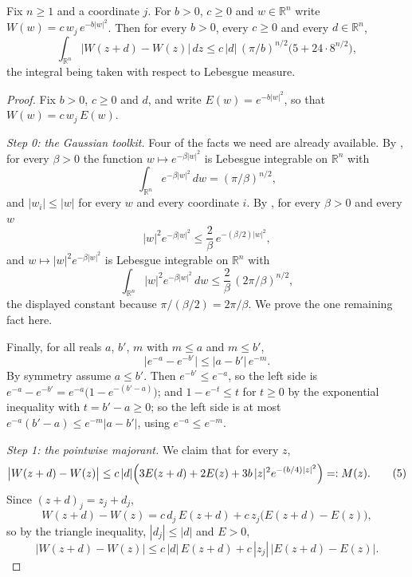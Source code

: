 \begin{lemma}
Fix $n \geq 1$ and a coordinate $j$.  For $b > 0$, $c \geq 0$ and
$w \in \mathbb{R}^n$ write $W(w) = c\,w_j\,e^{-b|w|^2}$.  Then for every $b > 0$,
every $c \geq 0$ and every $d \in \mathbb{R}^n$,
\[
  \int_{\mathbb{R}^n}\bigl|W(z+d)-W(z)\bigr|\,dz
    \leq c\,|d|\,(\pi/b)^{n/2}\bigl(5+24\cdot 8^{n/2}\bigr) ,
\]
the integral being taken with respect to Lebesgue measure.
\end{lemma}
\begin{proof}
Fix $b > 0$, $c \geq 0$ and $d$, and write $E(w) = e^{-b|w|^2}$, so that
$W(w) = c\,w_j\,E(w)$.

\emph{Step 0: the Gaussian toolkit.}
Four of the facts we need are already available.  By
, for every $\beta > 0$ the function
$w \mapsto e^{-\beta|w|^2}$ is Lebesgue integrable on $\mathbb{R}^n$ with
\begin{equation*}
  \int_{\mathbb{R}^n} e^{-\beta|w|^2}\,dw = (\pi/\beta)^{n/2} , \tag{1}
\end{equation*}
and $|w_i| \leq |w|$ for every $w$ and every coordinate $i$.  By
, for every $\beta > 0$ and every $w$
\begin{equation*}
  |w|^2e^{-\beta|w|^2} \leq \frac2\beta\,e^{-(\beta/2)|w|^2} , \tag{2}
\end{equation*}
and $w \mapsto |w|^2e^{-\beta|w|^2}$ is Lebesgue integrable on $\mathbb{R}^n$ with
\begin{equation*}
  \int_{\mathbb{R}^n}|w|^2e^{-\beta|w|^2}\,dw
    \leq \frac2\beta\,(2\pi/\beta)^{n/2} , \tag{3}
\end{equation*}
the displayed constant because $\pi/(\beta/2) = 2\pi/\beta$.  We prove the one
remaining fact here.

Finally, for all reals $a$, $b'$, $m$ with $m \leq a$ and $m \leq b'$,
\begin{equation*}
  \bigl|e^{-a}-e^{-b'}\bigr| \leq |a-b'|\,e^{-m} . \tag{4}
\end{equation*}
By symmetry assume $a \leq b'$.  Then $e^{-b'} \leq e^{-a}$, so the left side is
$e^{-a}-e^{-b'} = e^{-a}\bigl(1-e^{-(b'-a)}\bigr)$; and $1-e^{-t} \leq t$ for
$t \geq 0$ by the exponential inequality with $t = b'-a \geq 0$; so the left side
is at most $e^{-a}(b'-a) \leq e^{-m}|a-b'|$, using $e^{-a} \leq e^{-m}$.

\emph{Step 1: the pointwise majorant.}
We claim that for every $z$,
\begin{equation*}
  \bigl|W(z+d)-W(z)\bigr|
    \leq c\,|d|\Bigl(3E(z+d) + 2E(z) + 3b\,|z|^2e^{-(b/4)|z|^2}\Bigr)
    =: M(z) . \tag{5}
\end{equation*}
Since $(z+d)_j = z_j + d_j$,
\[
  W(z+d)-W(z) = c\,d_j\,E(z+d) + c\,z_j\bigl(E(z+d)-E(z)\bigr) ,
\]
so by the triangle inequality, $|d_j| \leq |d|$ and $E > 0$,
\begin{equation*}
  \bigl|W(z+d)-W(z)\bigr|
    \leq c\,|d|\,E(z+d) + c\,|z_j|\,\bigl|E(z+d)-E(z)\bigr| . \tag{6}
\end{equation*}


\end{proof}
